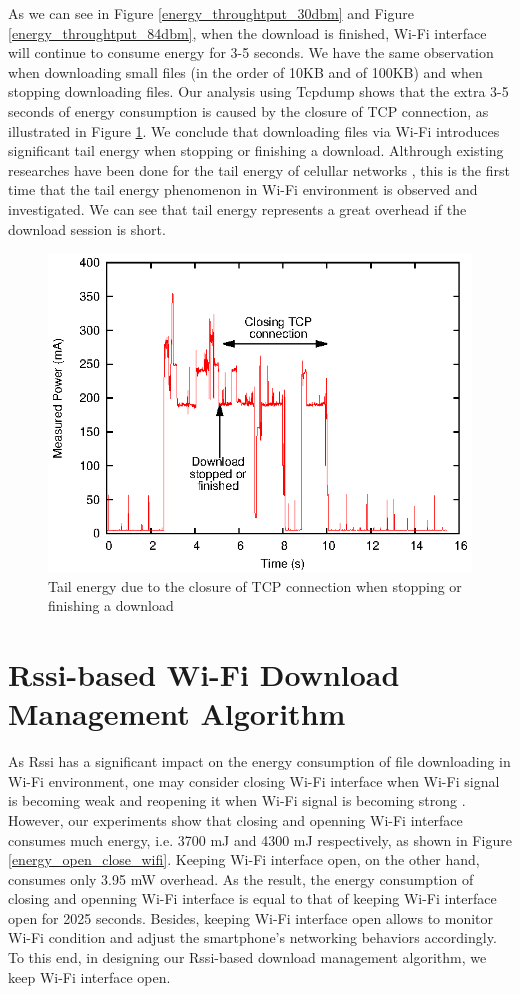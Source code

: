 \documentclass[journal]{IEEEtran}
\begin{document}
As we can see in Figure \ref{energy_throughtput_30dbm} and Figure \ref{energy_throughtput_84dbm}, 
when the download is finished, Wi-Fi interface will continue to consume energy for 3-5 seconds.
We have the same observation when downloading small files (in the order of 10KB and of 100KB) and when stopping downloading files.
Our analysis using Tcpdump shows that the extra 3-5 seconds of energy consumption
is caused by the closure of TCP connection, as illustrated in Figure \ref{tail_energy}. 
We conclude that downloading files via Wi-Fi introduces
significant tail energy when stopping or finishing a download.
Althrough existing researches have been done for the tail energy of celullar networks \cite{biblio6},
this is the first time that the tail energy phenomenon in Wi-Fi environment
is observed and investigated.
We can see that tail energy represents a great overhead if the download session is short.

\begin{figure}
\centering
\includegraphics[scale=0.95]{tail_energy.eps}
\caption{Tail energy due to the closure of TCP connection when stopping or finishing a download}
\label{tail_energy}
\end{figure}

\section{Rssi-based Wi-Fi Download Management Algorithm}
As Rssi has a significant impact on the energy consumption of file downloading in Wi-Fi environment, one may consider closing Wi-Fi interface 
when Wi-Fi signal is becoming weak and reopening it when Wi-Fi signal is becoming strong \cite{biblio7}. However, our experiments show that 
closing and openning Wi-Fi interface consumes much energy, i.e. 3700 mJ and 4300 mJ respectively, as shown in Figure \ref{energy_open_close_wifi}. 
Keeping Wi-Fi interface open, on the other hand, consumes only 3.95 mW overhead. 
As the result, the energy consumption of closing and openning Wi-Fi interface 
is equal to that of keeping Wi-Fi interface open for 2025 seconds.
Besides, keeping Wi-Fi interface open allows to monitor Wi-Fi condition and adjust the smartphone's networking behaviors accordingly.
To this end, in designing our Rssi-based download management algorithm, we keep Wi-Fi interface open.
\end{document}
